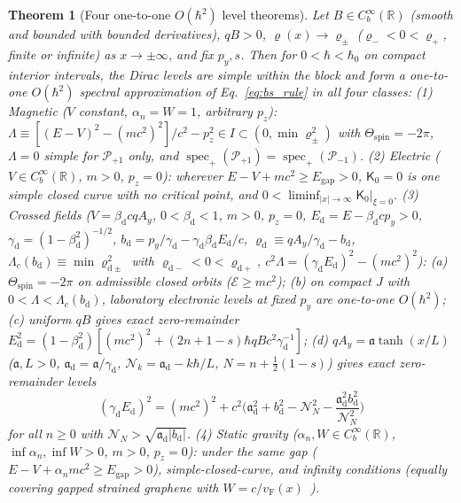 \documentclass[aps,prl,reprint,superscriptaddress,nofootinbib,floatfix]{revtex4-2}
\theoremstyle{prlthm}
\newtheorem{theorem}{Theorem}
\begin{document}
\begin{theorem}[Four one-to-one $O(\hbar^2)$ level theorems]\label{thm:all_four}
Let $B\in C_b^\infty(\mathbb{R})$ (smooth and bounded with bounded derivatives), $qB>0$, $\varrho(x)\to\varrho_\pm$ ($\varrho_-<0<\varrho_+$, finite or infinite) as $x\to\pm\infty$, and fix $p_y,s$. Then for $0<\hbar<\hbar_0$ on compact interior intervals, the Dirac levels are simple within the block and form a \emph{one-to-one} $O(\hbar^2)$ spectral approximation of Eq.~\eqref{eq:bs_rule} in all four classes:
(1) \emph{Magnetic} ($V$ constant, $\alpha_n=W=1$, arbitrary $p_z$): $\Lambda\equiv[(E-V)^2-(mc^2)^2]/c^2-p_z^2\in I\subset(0,\min\varrho_\pm^2)$ with $\Theta_{\mathrm{spin}}=-2\pi$, $\Lambda=0$ simple for $\mathcal{P}_{+1}$ only, and $\operatorname{spec}_+(\mathcal{P}_{+1})=\operatorname{spec}_+(\mathcal{P}_{-1})$.
(2) \emph{Electric} ($V\in C_b^\infty(\mathbb{R})$, $m>0$, $p_z=0$): wherever $E-V+mc^2\ge E_{\mathrm{gap}}>0$, $\mathsf{K}_0=0$ is one simple closed curve with no critical point, and $0<\liminf_{|x|\to\infty}\mathsf{K}_0|_{\xi=0}$.
(3) \emph{Crossed fields} ($V=\beta_{\mathrm{d}}cqA_y$, $0<\beta_{\mathrm{d}}<1$, $m>0$, $p_z=0$, $E_{\mathrm{d}}=E-\beta_{\mathrm{d}}cp_y>0$, $\gamma_{\mathrm{d}}=(1-\beta_{\mathrm{d}}^2)^{-1/2}$, $b_{\mathrm{d}}=p_y/\gamma_{\mathrm{d}}-\gamma_{\mathrm{d}}\beta_{\mathrm{d}}E_{\mathrm{d}}/c$, $\varrho_{\mathrm{d}}\equiv qA_y/\gamma_{\mathrm{d}}-b_{\mathrm{d}}$, $\Lambda_c(b_{\mathrm{d}})\equiv\min\varrho_{\mathrm{d}\pm}^2$ with $\varrho_{\mathrm{d}-}<0<\varrho_{\mathrm{d}+}$, $c^2\Lambda=(\gamma_{\mathrm{d}}E_{\mathrm{d}})^2-(mc^2)^2$): (a) $\Theta_{\mathrm{spin}}=-2\pi$ on admissible closed orbits ($\mathcal{E}\ge mc^2$); (b) on compact $J$ with $0<\Lambda<\Lambda_c(b_{\mathrm{d}})$, laboratory electronic levels at fixed $p_y$ are one-to-one $O(\hbar^2)$; (c) uniform $qB$ gives exact zero-remainder $E_{\mathrm{d}}^2=(1-\beta_{\mathrm{d}}^2)[(mc^2)^2+(2n+1-s)\hbar qBc^2\gamma_{\mathrm{d}}^{-1}]$; (d) $qA_y=\mathfrak{a}\tanh(x/L)$ ($\mathfrak{a},L>0$, $\mathfrak{a}_{\mathrm{d}}=\mathfrak{a}/\gamma_{\mathrm{d}}$, $\mathcal{N}_k=\mathfrak{a}_{\mathrm{d}}-k\hbar/L$, $N=n+\tfrac{1}{2}(1-s)$) gives exact zero-remainder levels
\begin{equation}
  (\gamma_{\mathrm{d}}E_{\mathrm{d}})^2=(mc^2)^2+c^2\Big(\mathfrak{a}_{\mathrm{d}}^2+b_{\mathrm{d}}^2-\mathcal{N}_N^2-\frac{\mathfrak{a}_{\mathrm{d}}^2b_{\mathrm{d}}^2}{\mathcal{N}_N^2}\Big)
  \label{eq:crossed_tanh}
\end{equation}
for all $n\ge 0$ with $\mathcal{N}_N>\sqrt{\mathfrak{a}_{\mathrm{d}}|b_{\mathrm{d}}|}$.
(4) \emph{Static gravity} ($\alpha_n,W\in C_b^\infty(\mathbb{R})$, $\inf\alpha_n,\inf W>0$, $m>0$, $p_z=0$): under the same gap ($E-V+\alpha_n mc^2\ge E_{\mathrm{gap}}>0$), simple-closed-curve, and infinity conditions (equally covering gapped strained graphene with $W=c/v_{\mathrm{F}}(x)$~\citep{deJuanSturlaVozmediano2012Space}).
\end{theorem}
\end{document}
